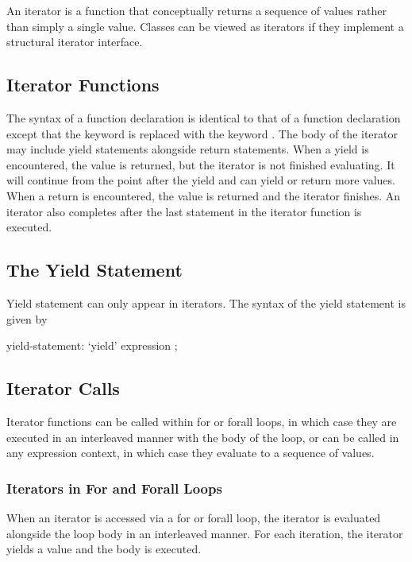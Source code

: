 \label{Iterators}

An iterator is a function that conceptually returns a sequence of
values rather than simply a single value.  Classes can be viewed as
iterators if they implement a structural iterator interface.

\subsection{Iterator Functions}
\label{Iterator_Functions}

The syntax of a function declaration is identical to that of a
function declaration except that the keyword  is replaced
with the keyword .  The body of the iterator may
include yield statements alongside return statements.  When a yield is
encountered, the value is returned, but the iterator is not finished
evaluating.  It will continue from the point after the yield and can
yield or return more values.  When a return is encountered, the value
is returned and the iterator finishes.  An iterator also completes
after the last statement in the iterator function is executed.

\subsection{The Yield Statement}
\label{The_Yield_Statement}

Yield statement can only appear in iterators.  The syntax of the yield
statement is given by
\begin{syntax}
yield-statement:
  `yield' expression ;
\end{syntax}

\subsection{Iterator Calls}
\label{Iterator_Calls}

Iterator functions can be called within for or forall loops, in which
case they are executed in an interleaved manner with the body of the
loop, or can be called in any expression context, in which case they
evaluate to a sequence of values.

\subsubsection{Iterators in For and Forall Loops}
\label{Iterators_in_For_and_Forall_Loops}

When an iterator is accessed via a for or forall loop, the iterator is
evaluated alongside the loop body in an interleaved manner.  For each
iteration, the iterator yields a value and the body is executed.

